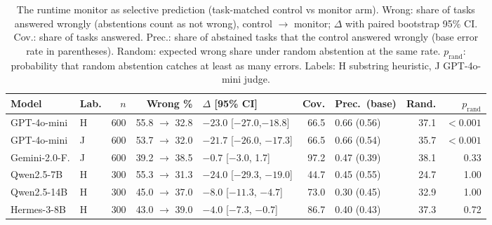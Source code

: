 \begin{table}[!tbp]
\centering
\caption{The runtime monitor as selective prediction (task-matched control vs monitor arm). Wrong: share of tasks answered wrongly (abstentions count as not wrong), control $\to$ monitor; $\Delta$ with paired bootstrap 95\% CI. Cov.: share of tasks answered. Prec.: share of abstained tasks that the control answered wrongly (base error rate in parentheses). Random: expected wrong share under random abstention at the same rate. $p_{\mathrm{rand}}$: probability that random abstention catches at least as many errors. Labels: H substring heuristic, J GPT-4o-mini judge.}
\label{tab:monitor}
\footnotesize
\setlength{\tabcolsep}{3.5pt}
\begin{tabular}{@{}llrrlrlrr@{}}
\toprule
Model & Lab. & $n$ & Wrong \% & $\Delta$ [95\% CI] & Cov. & Prec.\ (base) & Rand. & $p_{\mathrm{rand}}$ \\
\midrule
GPT-4o-mini & H & 600 & 55.8 $\to$ 32.8 & $-23.0$ [$-27.0$,$-18.8$] & 66.5 & 0.66 (0.56) & 37.1 & $<0.001$ \\
GPT-4o-mini & J & 600 & 53.7 $\to$ 32.0 & $-21.7$ [$-26.0$, $-17.3$] & 66.5 & 0.66 (0.54) & 35.7 & $<0.001$ \\
Gemini-2.0-F. & J & 600 & 39.2 $\to$ 38.5 & $-0.7$ [$-3.0$, 1.7] & 97.2 & 0.47 (0.39) & 38.1 & 0.33 \\
Qwen2.5-7B & H & 300 & 55.3 $\to$ 31.3 & $-24.0$ [$-29.3$, $-19.0$] & 44.7 & 0.45 (0.55) & 24.7 & 1.00 \\
Qwen2.5-14B & H & 300 & 45.0 $\to$ 37.0 & $-8.0$ [$-11.3$, $-4.7$] & 73.0 & 0.30 (0.45) & 32.9 & 1.00 \\
Hermes-3-8B & H & 300 & 43.0 $\to$ 39.0 & $-4.0$ [$-7.3$, $-0.7$] & 86.7 & 0.40 (0.43) & 37.3 & 0.72 \\
\bottomrule
\end{tabular}
\end{table}
